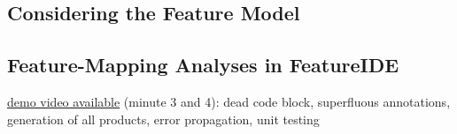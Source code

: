 \subsection{Considering the Feature Model}


\begin{frame}{\myframetitle}
	\begin{mycolumns}
	\mynextcolumn
	\end{mycolumns}
\end{frame}

\subsection{Feature-Mapping Analyses in FeatureIDE}

\begin{frame}{\myframetitle}
	\begin{mycolumns}
		\href{https://youtu.be/jVe7f32mLCQ?t=125}{demo video available} (minute 3 and 4): dead code block, superfluous annotations, generation of all products, error propagation, unit testing
	\mynextcolumn
	\end{mycolumns}
\end{frame}
